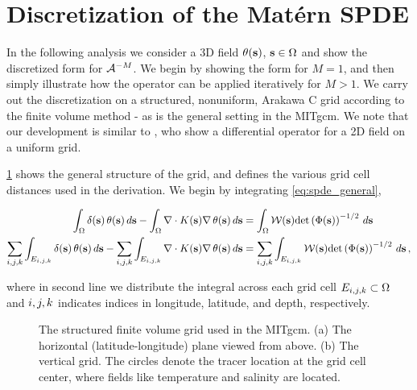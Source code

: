 \section{Discretization of the Mat\'ern SPDE}
\label{sec:discretization_matern}

In the following analysis we consider a 3D field
$\theta(\mathbf{s})$, $\mathbf{s}\in\Omega$ and show the discretized form for $\mathcal{A}^{-M}$.
We begin by showing the form for $M=1$, and then simply illustrate how the
operator can be applied iteratively for $M>1$.
We carry out the discretization on a structured, nonuniform, Arakawa C
grid \citep{arakawa_computational_1977}
according to the finite volume method - as is the general setting in the MITgcm.
We note that our development is similar to \citet{fuglstad_exploring_2015},
who show a differential operator for a 2D field on a uniform grid.

\cref{fig:mitgcm_grid} shows the general structure of the grid, and
defines the various grid cell distances used in the derivation.
We begin by integrating \cref{eq:spde_general},
\begin{linenomath*}\begin{equation}
    \begin{aligned}
        \int_{\Omega} \delta(\mathbf{s})\,\theta(\mathbf{s})\, d\mathbf{s} -
        \int_{\Omega} \nabla\cdot K(\mathbf{s})\nabla\,\theta(\mathbf{s})\,d\mathbf{s}
        &=
        \int_{\Omega} \mathcal{W}(\mathbf{s})\text{det}\left(\Phi(\mathbf{s})\right)^{-1/2} \, d\mathbf{s} \\
        \sum_{{i,j,k}}\int_{E_{i,j,k}} \delta(\mathbf{s})\,\theta(\mathbf{s})\, d\mathbf{s} -
        \sum_{{i,j,k}}\int_{E_{i,j,k}} \nabla\cdot K(\mathbf{s})\nabla\,\theta(\mathbf{s})\,d\mathbf{s}
        &=
        \sum_{{i,j,k}}\int_{E_{i,j,k}} \mathcal{W}(\mathbf{s})\text{det}\left(\Phi(\mathbf{s})\right)^{-1/2} \, d\mathbf{s} \, ,
    \end{aligned}
    \label{eq:spde_integral}
\end{equation}\end{linenomath*}
where in second line we distribute the integral across each grid cell
$E_{i,j,k}\subset\Omega$ and ${i,j,k}$ indicates indices in longitude, latitude,
and depth, respectively.

\begin{figure}
    \centering
    \caption{The structured finite volume grid used in the MITgcm.
        (a) The horizontal (latitude-longitude) plane viewed from above.
        (b) The vertical grid.
        The circles denote the tracer location at the grid cell center,
        where fields like temperature and salinity are located.
    }
    \label{fig:mitgcm_grid}
\end{figure}

